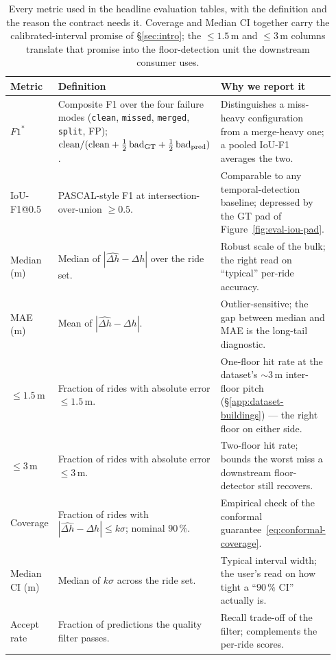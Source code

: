 \documentclass[manuscript,review,screen]{acmart}
\begin{document}
\begin{table}[H]
\centering
\small
\renewcommand{\arraystretch}{1.2}
\begin{tabular}{p{0.20\linewidth} p{0.36\linewidth} p{0.38\linewidth}}
\toprule
\textbf{Metric} & \textbf{Definition} & \textbf{Why we report it} \\
\midrule
$F1^{\ast}$ & Composite F1 over the four failure modes
  (\texttt{clean}, \texttt{missed}, \texttt{merged},
  \texttt{split}, FP); $\text{clean}/(\text{clean}+\frac12\,
  \text{bad}_{\rm GT}+\frac12\,\text{bad}_{\rm pred})$. &
  Distinguishes a miss-heavy configuration from a merge-heavy one;
  a pooled IoU-F1 averages the two. \\
IoU-F1@0.5 & PASCAL-style F1 at intersection-over-union $\ge 0.5$. &
  Comparable to any temporal-detection baseline; depressed by the
  GT pad of Figure~\ref{fig:eval-iou-pad}. \\
Median (m) & Median of $|\widehat{\Delta h}-\Delta h|$ over the
  ride set. & Robust scale of the bulk; the right read on
  ``typical'' per-ride accuracy. \\
MAE (m) & Mean of $|\widehat{\Delta h}-\Delta h|$. & Outlier-sensitive;
  the gap between median and MAE is the long-tail diagnostic. \\
$\le 1.5$\,m & Fraction of rides with absolute error $\le 1.5$\,m. &
  One-floor hit rate at the dataset's $\sim 3$\,m inter-floor pitch
  (\S\ref{app:dataset-buildings}) --- the right floor on either side. \\
$\le 3$\,m & Fraction of rides with absolute error $\le 3$\,m. &
  Two-floor hit rate; bounds the worst miss a downstream
  floor-detector still recovers. \\
Coverage & Fraction of rides with $|\widehat{\Delta h}-\Delta h|
  \le k\sigma$; nominal $90\,\%$. & Empirical check of the
  conformal guarantee~\eqref{eq:conformal-coverage}. \\
Median CI (m) & Median of $k\sigma$ across the ride set. &
  Typical interval width; the user's read on how tight a
  ``$90\,\%$ CI'' actually is. \\
Accept rate & Fraction of predictions the quality filter passes. &
  Recall trade-off of the filter; complements the per-ride scores. \\
\bottomrule
\end{tabular}
\caption{Every metric used in the headline evaluation tables, with
  the definition and the reason the contract needs it.  Coverage
  and Median CI together carry the calibrated-interval promise of
  \S\ref{sec:intro}; the $\le 1.5$\,m and $\le 3$\,m columns
  translate that promise into the floor-detection unit the
  downstream consumer uses.}
\label{tab:eval-metric-defs}
\end{table}
\end{document}

